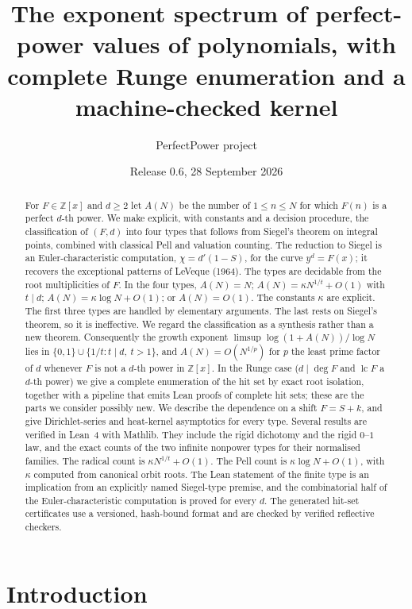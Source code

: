 \documentclass[11pt]{amsart}
\title[Perfect-power values of polynomials]{The exponent spectrum of perfect-power values of polynomials, with complete Runge enumeration and a machine-checked kernel}
\author{PerfectPower project}
\date{Release 0.6, 28 September 2026}
\theoremstyle{definition}
\theoremstyle{remark}
\newcommand{\Z}{\mathbb{Z}}
\newcommand{\lc}{\operatorname{lc}}
\begin{document}
\begin{abstract}
For $F\in\Z[x]$ and $d\ge2$ let $A(N)$ be the number of $1\le n\le N$ for which $F(n)$ is a perfect $d$-th power. We make explicit, with constants and a decision procedure, the classification of $(F,d)$ into four types that follows from Siegel's theorem on integral points, combined with classical Pell and valuation counting. The reduction to Siegel is an Euler-characteristic computation, $\chi=d'(1-S)$, for the curve $y^d=F(x)$; it recovers the exceptional patterns of LeVeque (1964). The types are decidable from the root multiplicities of $F$. In the four types, $A(N)=N$; $A(N)=\kappa N^{1/t}+O(1)$ with $t\mid d$; $A(N)=\kappa\log N+O(1)$; or $A(N)=O(1)$. The constants $\kappa$ are explicit. The first three types are handled by elementary arguments. The last rests on Siegel's theorem, so it is ineffective. We regard the classification as a synthesis rather than a new theorem. Consequently the growth exponent $\limsup\log(1+A(N))/\log N$ lies in $\{0,1\}\cup\{1/t:t\mid d,\ t>1\}$, and $A(N)=O(N^{1/p})$ for $p$ the least prime factor of $d$ whenever $F$ is not a $d$-th power in $\Z[x]$. In the Runge case ($d\mid\deg F$ and $\lc F$ a $d$-th power) we give a complete enumeration of the hit set by exact root isolation, together with a pipeline that emits Lean proofs of complete hit sets; these are the parts we consider possibly new. We describe the dependence on a shift $F=S+k$, and give Dirichlet-series and heat-kernel asymptotics for every type. Several results are verified in Lean~4 with Mathlib. They include the rigid dichotomy and the rigid $0$--$1$ law, and the exact counts of the two infinite nonpower types for their normalised families. The radical count is $\kappa N^{1/t}+O(1)$. The Pell count is $\kappa\log N+O(1)$, with $\kappa$ computed from canonical orbit roots. The Lean statement of the finite type is an implication from an explicitly named Siegel-type premise, and the combinatorial half of the Euler-characteristic computation is proved for every $d$. The generated hit-set certificates use a versioned, hash-bound format and are checked by verified reflective checkers.
\end{abstract}
\maketitle

\section{Introduction}
\end{document}
